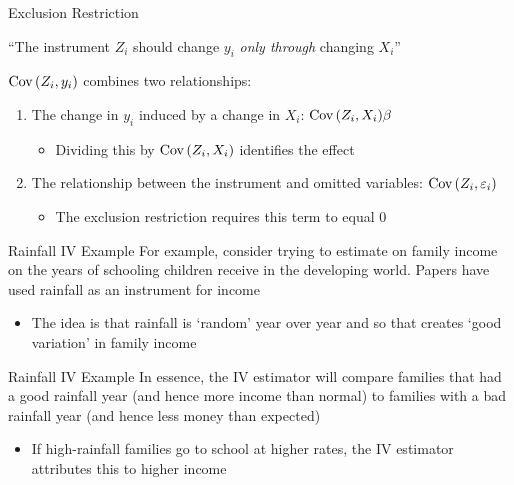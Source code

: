 \documentclass[aspectratio=169,t,11pt,table]{beamer}
\begin{document}
\begin{frame}{Exclusion Restriction}
  \begin{center}
    ``The instrument $Z_i$ should change $y_i$ \emph{only through} changing $X_i$''
  \end{center}

  \bigskip
  $\cov{Z_i, y_i}$ combines two relationships:

  \bigskip
  \begin{enumerate}
    \item The change in $y_i$ induced by a change in $X_i$: $\cov{Z_i, X_i} \beta$
    \begin{itemize}
      \item Dividing this by $\cov{Z_i, X_i}$ identifies the effect
    \end{itemize}

    \pause
    \medskip
    \item The relationship between the instrument and omitted variables: $\cov{Z_i, \varepsilon_i}$
    \begin{itemize}
      \item The exclusion restriction requires this term to equal 0
    \end{itemize}
  \end{enumerate}
\end{frame}


\begin{frame}{Rainfall IV Example}
  For example, consider trying to estimate on family income on the years of schooling children receive in the developing world. Papers have used rainfall as an instrument for income
  \begin{itemize}
    \item The idea is that rainfall is `random' year over year and so that creates `good variation' in family income
  \end{itemize}
\end{frame}

\begin{frame}{Rainfall IV Example}
  In essence, the IV estimator will compare families that had a good rainfall year (and hence more income than normal) to families with a bad rainfall year (and hence less money than expected)
  \begin{itemize}
    \item If high-rainfall families go to school at higher rates, the IV estimator attributes this to higher income
  \end{itemize}
\end{frame}
\end{document}
